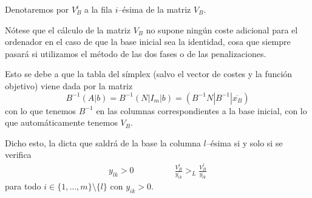 Denotaremos por $V_B^i$ a la fila $i$--ésima de la matriz $V_B$.
\begin{obs}[Cálculo de $V_B$]
	Nótese que el cálculo de la matriz $V_B$ no supone ningún coste adicional para el ordenador en el caso de que la base inicial sea la identidad, cosa que siempre pasará si utilizamos el método de las dos fases o de las penalizaciones.

	Esto se debe a que la tabla del símplex (salvo el vector de costes y la función objetivo) viene dada por la matriz
	\begin{equation*}
		B^{-1}(A|b)=B^{-1}(N|I_m|b)=(B^{-1}N|B^{-1}|\overline{x_B})
	\end{equation*}
	con lo que tenemos $B^{-1}$ en las columnas correspondientes a la base inicial, con lo que automáticamente tenemos $V_B$.
\end{obs}
Dicho esto, la  dicta que saldrá de la base la columna $l$--ésima si y solo si se verifica
\begin{equation}
\label{simp_eq_lexico}
	\begin{array}{cc}
		y_{lk}>0 \qquad&\qquad \displaystyle{\frac{V_B^i}{y_{ik}}>_L\frac{V_B^l}{y_{lk}}}
	\end{array}
\end{equation}
para todo $i\in\{1,\dots,m\}\setminus\{l\}$ con $y_{ik}>0$.

